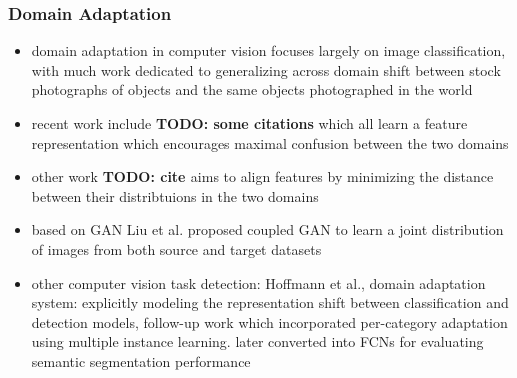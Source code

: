 \documentclass[]{article}
\newcommand{\todo}[1]{{\color{red}\bf{TODO: #1}}}
\begin{document}
\subsubsection{Domain Adaptation}
\begin{itemize}
	\item domain adaptation in computer vision focuses largely on image classification, with much work dedicated to generalizing across domain shift between stock photographs of objects and the same objects photographed in the world
	\item recent work include \todo{some citations} which all learn a feature representation which encourages maximal confusion between the two domains
	\item other work \todo{cite }aims to align features by minimizing the distance between their distribtuions in the two domains
	\item based on GAN Liu et al. proposed coupled GAN to learn a joint distribution of images from both source and target datasets
	\item other computer vision task detection: Hoffmann et al., domain adaptation system: explicitly modeling the representation shift between classification and detection models, follow-up work which incorporated per-category adaptation using multiple instance learning. later converted into FCNs for evaluating semantic segmentation performance
\end{itemize}
\end{document}
